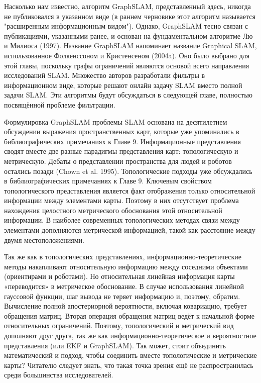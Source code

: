 \documentclass[10pt,a4paper]{article}
\begin{document}
Насколько нам известно, алгоритм GraphSLAM, представленный здесь, никогда не публиковался в указанном виде (в раннем черновике этот алгоритм называется "расширенным информационным видом"). Однако, GraphSLAM тесно связан с публикациями, указанными ранее, и основан на фундаментальном алгоритме Лю и Милиоса (1997). Название GraphSLAM напоминает название Graphical SLAM, использованное Фолкенссоном и Кристенсеном (2004a). Оно было выбрано для этой главы, поскольку графы ограничений являются основой всего направления исследований SLAM. Множество авторов разработали фильтры в информационном виде, которые решают онлайн задачу SLAM вместо полной задачи SLAM. Эти алгоритмы будут обсуждаться в следующей главе, полностью посвящённой проблеме фильтрации.

Формулировка GraphSLAM проблемы SLAM основана на десятилетнем обсуждении выражения пространственных карт, которые уже упоминались в библиографических примечаниях к Главе 9. Информационные представления сводят вместе две разные парадигмы представления карт: топологическую и метрическую. Дебаты о представлении пространства для людей и роботов остались позади  (Chown et al. 1995). Топологические подходы уже обсуждались в библиографических примечаниях к Главе 9. Ключевым свойством топологического представления является факт отображения только относительной информации между элементами карты. Поэтому в них отсутствует проблема нахождения целостного метрического обоснования этой относительной информации. В наиболее современных топологических методах связи между элементами дополняются метрической информацией, такой как расстояние между двумя местоположениями.

Так же как в топологических представлениях, информационно-теоретические методы накапливают относительную информацию между соседними объектами (ориентирами и роботами). Но относительная линейная информация карты «переводится» в метрическое обоснование. В случае использования линейной гауссовой функции, шаг вывода не теряет информацию и, поэтому, обратим. Вычисление полной апостериорной вероятности, включая ковариацию, требует обращения матриц. Вторая операция обращения матриц ведёт к начальной форме относительных ограничений. Поэтому, топологический и метрический вид дополняют друг друга, так же как информационно-теоретическое и вероятностное представления (или EKF и GraphSLAM). Так может, стоит объединить математический и подход, чтобы соединить вместе топологические и метрические карты? Читателю следует знать, что такая точка зрения ещё не распространилась среди большинства исследователей.\\
\end{document}
